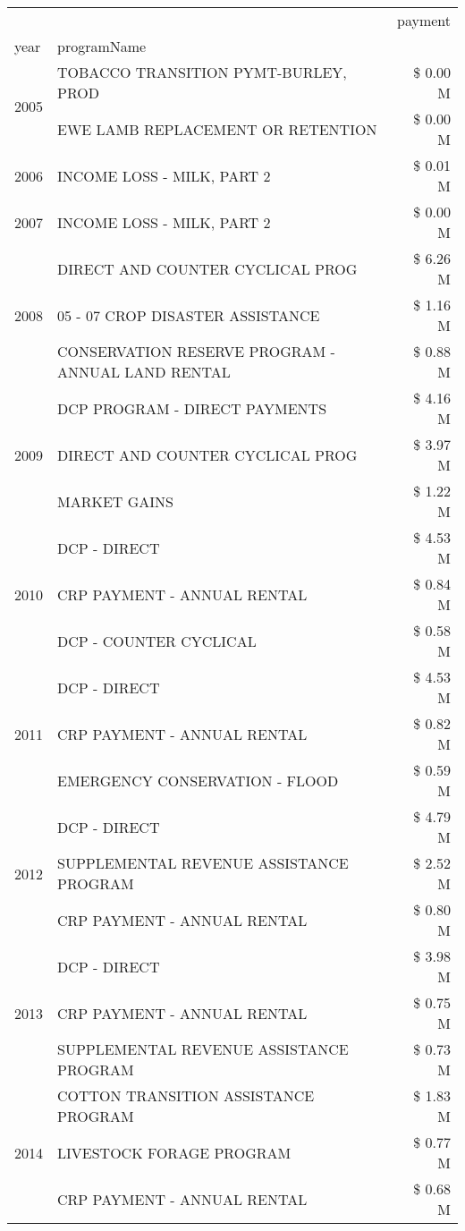 \begin{tabular}{llr}
\toprule
 &  & payment \\
year & programName &  \\
\midrule
\multirow[t]{2}{*}{2005} & TOBACCO TRANSITION PYMT-BURLEY, PROD & \$ 0.00 M \\
 & EWE LAMB REPLACEMENT OR RETENTION & \$ 0.00 M \\
\cline{1-3}
2006 & INCOME LOSS - MILK, PART 2 & \$ 0.01 M \\
\cline{1-3}
2007 & INCOME LOSS - MILK, PART 2 & \$ 0.00 M \\
\cline{1-3}
\multirow[t]{3}{*}{2008} & DIRECT AND COUNTER CYCLICAL PROG & \$ 6.26 M \\
 & 05 - 07 CROP DISASTER ASSISTANCE & \$ 1.16 M \\
 & CONSERVATION RESERVE PROGRAM - ANNUAL LAND RENTAL & \$ 0.88 M \\
\cline{1-3}
\multirow[t]{3}{*}{2009} & DCP PROGRAM - DIRECT PAYMENTS & \$ 4.16 M \\
 & DIRECT AND COUNTER CYCLICAL PROG & \$ 3.97 M \\
 & MARKET GAINS & \$ 1.22 M \\
\cline{1-3}
\multirow[t]{3}{*}{2010} & DCP - DIRECT & \$ 4.53 M \\
 & CRP PAYMENT - ANNUAL RENTAL & \$ 0.84 M \\
 & DCP - COUNTER CYCLICAL & \$ 0.58 M \\
\cline{1-3}
\multirow[t]{3}{*}{2011} & DCP - DIRECT & \$ 4.53 M \\
 & CRP PAYMENT - ANNUAL RENTAL & \$ 0.82 M \\
 & EMERGENCY CONSERVATION - FLOOD & \$ 0.59 M \\
\cline{1-3}
\multirow[t]{3}{*}{2012} & DCP - DIRECT & \$ 4.79 M \\
 & SUPPLEMENTAL REVENUE ASSISTANCE PROGRAM & \$ 2.52 M \\
 & CRP PAYMENT - ANNUAL RENTAL & \$ 0.80 M \\
\cline{1-3}
\multirow[t]{3}{*}{2013} & DCP - DIRECT & \$ 3.98 M \\
 & CRP PAYMENT - ANNUAL RENTAL & \$ 0.75 M \\
 & SUPPLEMENTAL REVENUE ASSISTANCE PROGRAM & \$ 0.73 M \\
\cline{1-3}
\multirow[t]{3}{*}{2014} & COTTON TRANSITION ASSISTANCE PROGRAM & \$ 1.83 M \\
 & LIVESTOCK FORAGE PROGRAM & \$ 0.77 M \\
 & CRP PAYMENT - ANNUAL RENTAL & \$ 0.68 M \\

\end{tabular}
